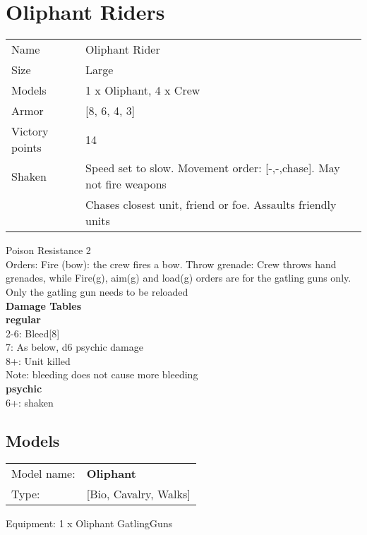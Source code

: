 \clearpage

\section{ Oliphant Riders }

\begin{tabular}{ll}
  Name & Oliphant Rider \\
  Size & Large\\
  Models & 1 x Oliphant, 4 x Crew\\
  Armor & [8, 6, 4, 3]\\
  Victory points & 14\\
  Shaken & Speed set to slow. Movement order: [-,-,chase]. May not fire weapons\\ &Chases closest unit, friend or foe. Assaults friendly units\\
\end{tabular}

Poison Resistance 2\\ 
Orders: Fire (bow): the crew fires a bow. Throw grenade: Crew throws hand grenades, while Fire(g), aim(g) and load(g) orders are for the gatling guns only. Only the gatling gun needs to be reloaded\\ 



{\bf Damage Tables} \\
 {\bf regular } \\
2-6: Bleed[8]  \\
7: As below, d6 psychic damage \\
8+: Unit killed \\
Note: bleeding does not cause more bleeding \\
 {\bf psychic } \\
6+: shaken \\


\clearpage

\subsection{ Models }

\begin{tabular}{ll}
Model name: & {\bf Oliphant } \\
Type: & [Bio, Cavalry, Walks] \\
\end{tabular}

Equipment: 1 x Oliphant GatlingGuns \\


